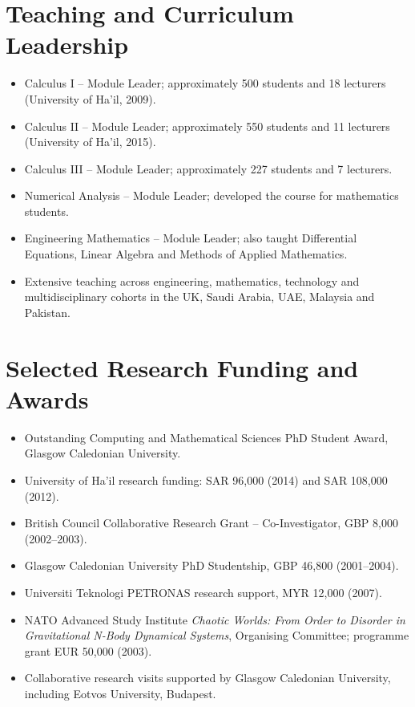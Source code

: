 \documentclass[10pt,a4paper]{article}
\begin{document}
\section{Teaching and Curriculum Leadership}
\begin{itemize}
\item Calculus I -- Module Leader; approximately 500 students and 18 lecturers (University of Ha'il, 2009).
\item Calculus II -- Module Leader; approximately 550 students and 11 lecturers (University of Ha'il, 2015).
\item Calculus III -- Module Leader; approximately 227 students and 7 lecturers.
\item Numerical Analysis -- Module Leader; developed the course for mathematics students.
\item Engineering Mathematics -- Module Leader; also taught Differential Equations, Linear Algebra and Methods of Applied Mathematics.
\item Extensive teaching across engineering, mathematics, technology and multidisciplinary cohorts in the UK, Saudi Arabia, UAE, Malaysia and Pakistan.
\end{itemize}

\section{Selected Research Funding and Awards}
\begin{itemize}
\item Outstanding Computing and Mathematical Sciences PhD Student Award, Glasgow Caledonian University.
\item University of Ha'il research funding: SAR 96,000 (2014) and SAR 108,000 (2012).
\item British Council Collaborative Research Grant -- Co-Investigator, GBP 8,000 (2002--2003).
\item Glasgow Caledonian University PhD Studentship, GBP 46,800 (2001--2004).
\item Universiti Teknologi PETRONAS research support, MYR 12,000 (2007).
\item NATO Advanced Study Institute \textit{Chaotic Worlds: From Order to Disorder in Gravitational N-Body Dynamical Systems}, Organising Committee; programme grant EUR 50,000 (2003).
\item Collaborative research visits supported by Glasgow Caledonian University, including Eotvos University, Budapest.
\end{itemize}
\end{document}
